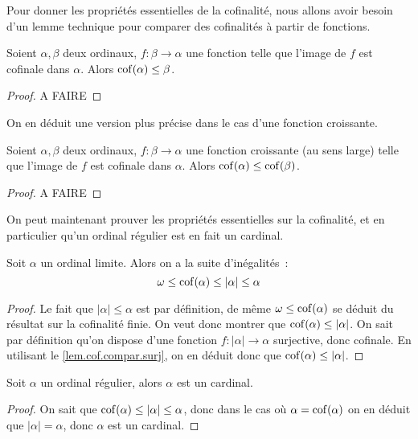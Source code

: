 Pour donner les propriétés essentielles de la cofinalité, nous allons avoir
besoin d'un lemme technique pour comparer des cofinalités à partir de fonctions.

\begin{proposition}\label{lem.cof.compar.surj}
  Soient $\alpha,\beta$ deux ordinaux, $f : \beta \to \alpha$ une fonction telle
  que l'image de $f$ est cofinale dans $\alpha$. Alors
  $\operatorname{cof}(\alpha) \leq \beta$.
\end{proposition}

\begin{proof}
  A FAIRE
\end{proof}

On en déduit une version plus précise dans le cas d'une fonction croissante.

\begin{proposition}
  Soient $\alpha,\beta$ deux ordinaux, $f : \beta \to \alpha$ une fonction
  croissante (au sens large) telle que l'image de $f$ est cofinale dans
  $\alpha$. Alors $\operatorname{cof}(\alpha)\leq\operatorname{cof}(\beta)$.
\end{proposition}

\begin{proof}
  A FAIRE
\end{proof}

On peut maintenant prouver les propriétés essentielles sur la cofinalité, et en
particulier qu'un ordinal régulier est en fait un cardinal.

\begin{proposition}
  Soit $\alpha$ un ordinal limite. Alors on a la suite d'inégalités~:
  \[\omega\leq \operatorname{cof}(\alpha) \leq |\alpha|\leq \alpha\]
\end{proposition}

\begin{proof}
  Le fait que $|\alpha|\leq \alpha$ est par définition, de même
  $\omega\leq\operatorname{cof}(\alpha)$ se déduit du résultat sur la cofinalité finie. On
  veut donc montrer que $\operatorname{cof}(\alpha) \leq|\alpha|$. On sait par définition
  qu'on dispose d'une fonction $f : |\alpha|\to \alpha$ surjective, donc
  cofinale. En utilisant le \cref{lem.cof.compar.surj}, on en déduit donc que
  $\operatorname{cof}(\alpha)\leq|\alpha|$.
\end{proof}

\begin{property}
  Soit $\alpha$ un ordinal régulier, alors $\alpha$ est un cardinal.
\end{property}

\begin{proof}
  On sait que $\operatorname{cof}(\alpha) \leq |\alpha| \leq \alpha$, donc dans le cas où
  $\alpha = \operatorname{cof}(\alpha)$ on en déduit que $|\alpha| = \alpha$, donc $\alpha$
  est un cardinal.
\end{proof}

